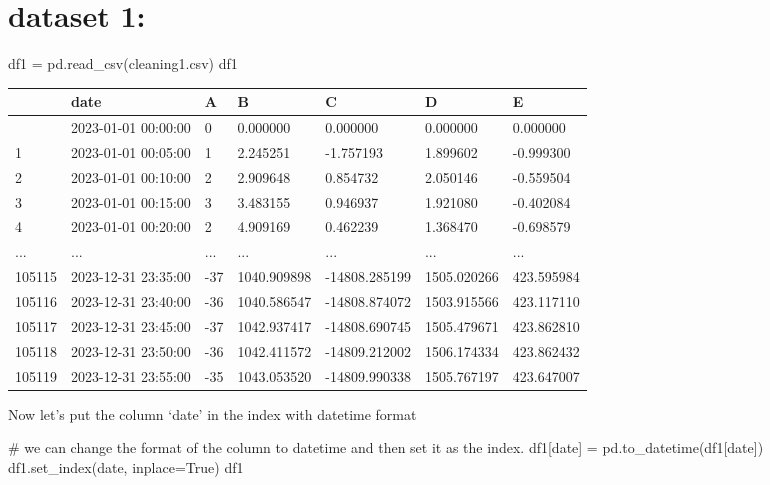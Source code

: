 \documentclass[
  letterpaper,
  DIV=11,
  numbers=noendperiod,
  oneside]{scrreprt}
\newenvironment{Shaded}{\begin{snugshade}}{\end{snugshade}}
\newcommand{\CommentTok}[1]{\textcolor[rgb]{0.37,0.37,0.37}{#1}}
\newcommand{\NormalTok}[1]{\textcolor[rgb]{0.00,0.23,0.31}{#1}}
\newcommand{\OperatorTok}[1]{\textcolor[rgb]{0.37,0.37,0.37}{#1}}
\newcommand{\StringTok}[1]{\textcolor[rgb]{0.13,0.47,0.30}{#1}}
\newcommand{\VariableTok}[1]{\textcolor[rgb]{0.07,0.07,0.07}{#1}}
\begin{document}
\hypertarget{dataset-1}{%
\section{dataset 1:}\label{dataset-1}}

\begin{Shaded}
\begin{Highlighting}[]
\NormalTok{df1 }\OperatorTok{=}\NormalTok{ pd.read\_csv(}\StringTok{\textquotesingle{}cleaning1.csv\textquotesingle{}}\NormalTok{)}
\NormalTok{df1}
\end{Highlighting}
\end{Shaded}

\begin{longtable}[]{@{}lllllll@{}}
\toprule\noalign{}
& date & A & B & C & D & E \\
\midrule\noalign{}
\endhead
\bottomrule\noalign{}
\endlastfoot
0 & 2023-01-01 00:00:00 & 0 & 0.000000 & 0.000000 & 0.000000 &
0.000000 \\
1 & 2023-01-01 00:05:00 & 1 & 2.245251 & -1.757193 & 1.899602 &
-0.999300 \\
2 & 2023-01-01 00:10:00 & 2 & 2.909648 & 0.854732 & 2.050146 &
-0.559504 \\
3 & 2023-01-01 00:15:00 & 3 & 3.483155 & 0.946937 & 1.921080 &
-0.402084 \\
4 & 2023-01-01 00:20:00 & 2 & 4.909169 & 0.462239 & 1.368470 &
-0.698579 \\
... & ... & ... & ... & ... & ... & ... \\
105115 & 2023-12-31 23:35:00 & -37 & 1040.909898 & -14808.285199 &
1505.020266 & 423.595984 \\
105116 & 2023-12-31 23:40:00 & -36 & 1040.586547 & -14808.874072 &
1503.915566 & 423.117110 \\
105117 & 2023-12-31 23:45:00 & -37 & 1042.937417 & -14808.690745 &
1505.479671 & 423.862810 \\
105118 & 2023-12-31 23:50:00 & -36 & 1042.411572 & -14809.212002 &
1506.174334 & 423.862432 \\
105119 & 2023-12-31 23:55:00 & -35 & 1043.053520 & -14809.990338 &
1505.767197 & 423.647007 \\
\end{longtable}

Now let's put the column `date' in the index with datetime format

\begin{Shaded}
\begin{Highlighting}[]
\CommentTok{\# we can change the format of the column to datetime and then set it as the index.}
\NormalTok{df1[}\StringTok{\textquotesingle{}date\textquotesingle{}}\NormalTok{] }\OperatorTok{=}\NormalTok{ pd.to\_datetime(df1[}\StringTok{\textquotesingle{}date\textquotesingle{}}\NormalTok{])}
\NormalTok{df1.set\_index(}\StringTok{\textquotesingle{}date\textquotesingle{}}\NormalTok{, inplace}\OperatorTok{=}\VariableTok{True}\NormalTok{)}
\NormalTok{df1}
\end{Highlighting}
\end{Shaded}
\end{document}
